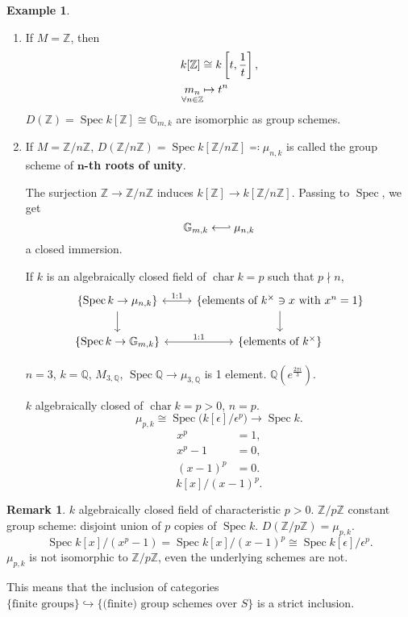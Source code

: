 \documentclass[12pt]{article}
\DeclareMathOperator{\Spec}{Spec}
\DeclareMathOperator{\chara}{char}
\theoremstyle{definition}
\newtheorem*{remark}{Remark}
\newtheorem*{example}{Example}
\begin{document}
\begin{example}
\begin{enumerate}[label=\arabic*)]
\item If $M=\mathbb{Z}$, then
\begin{align*}
k[\mathbb{Z}]&\cong k\left[t,\frac{1}{t}\right],\\
\underset{\mathclap{\forall n\in\mathbb{Z}}}{m_n}&\mapsto t^n
\end{align*}
$D(\mathbb{Z})=\Spec k[\mathbb{Z}]\cong\mathbb{G}_{m,k}$ are isomorphic as group schemes.

\item If $M=\mathbb{Z}/n\mathbb{Z}$, $D(\mathbb{Z}/n\mathbb{Z})=\Spec k[\mathbb{Z}/n\mathbb{Z}]\eqqcolon\mu_{n,k}$ is called the group scheme of \textbf{$\boldsymbol{n}$-th roots of unity}.

The surjection $\mathbb{Z}\rightarrow\mathbb{Z}/n\mathbb{Z}$ induces $k[\mathbb{Z}]\rightarrow k[\mathbb{Z}/n\mathbb{Z}]$. Passing to $\Spec$, we get
\[\mathbb{G}_{m,k}\longleftarrow\joinrel\rhook\mu_{n,k}\]
a closed immersion.

If $k$ is an algebraically closed field of $\chara k=p$ such that $p\nmid n$,
\[
\begin{tikzcd}
\{\Spec k\rightarrow\mu_{n,k}\}\arrow[r,<->,"1:1"]\arrow[d]&\{\text{elements of }k^{\times}\ni x\text{ with }x^n=1\}\arrow[d]\\
\{\Spec k\rightarrow\mathbb{G}_{m,k}\}\arrow[r,<->,"1:1"]&\{\text{elements of }k^{\times}\}
\end{tikzcd}
\]

$n=3$, $k=\mathbb{Q}$, $M_{3,\mathbb{Q}}$, $\Spec\mathbb{Q}\rightarrow\mu_{3,\mathbb{Q}}$ is 1 element. $\mathbb{Q}(e^{\frac{2\pi i}{3}})$.

$k$ algebraically closed of $\chara k=p>0$, $n=p$.
\[\mu_{p,k}\cong\Spec\big(k[\epsilon]/\epsilon^p\big)\longrightarrow\Spec k.\]
\begin{align*}
x^p&=1,\\
x^p-1&=0,\\
(x-1)^p&=0.
\end{align*}
\[k[x]/(x-1)^p.\]
\end{enumerate}
\end{example}

\begin{remark}
$k$ algebraically closed field of characteristic $p>0$. $\mathbb{Z}/p\mathbb{Z}$ constant group scheme: disjoint union of $p$ copies of $\Spec k$. $D(\mathbb{Z}/p\mathbb{Z})=\mu_{p,k}$.
\[\Spec k[x]/(x^p-1)=\Spec k[x]/(x-1)^p\cong\Spec k[\epsilon]/\epsilon^p.\]
$\mu_{p,k}$ is not isomorphic to $\mathbb{Z}/p\mathbb{Z}$, even the underlying schemes are not.

This means that the inclusion of categories $\{\text{finite groups}\}\hookrightarrow\{\text{(finite) group schemes over }S\}$ is a strict inclusion.
\end{remark}
\end{document}
